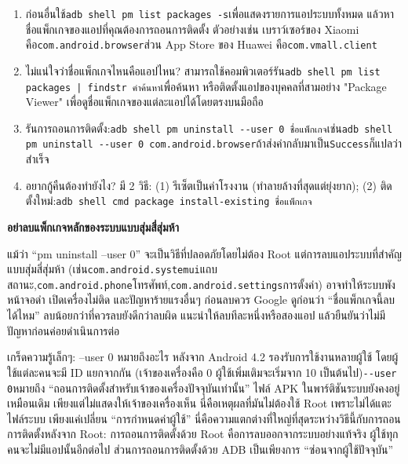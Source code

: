 \begin{enumerate}
  \item ก่อนอื่นใช้\texttt{adb shell pm list packages -\allowbreak s}เพื่อแสดงรายการแอประบบทั้งหมด แล้วหาชื่อแพ็กเกจของแอปที่คุณต้องการถอนการติดตั้ง ตัวอย่างเช่น เบราว์เซอร์ของ Xiaomi คือ\texttt{com.\allowbreak android.\allowbreak browser}ส่วน App Store ของ Huawei คือ\texttt{com.\allowbreak vmall.\allowbreak client}
  \item ไม่แน่ใจว่าชื่อแพ็กเกจไหนคือแอปไหน? สามารถใช้คอมพิวเตอร์รัน\texttt{adb shell pm list packages | findstr คำค้นหา}เพื่อค้นหา หรือติดตั้งแอปของบุคคลที่สามอย่าง "Package Viewer" เพื่อดูชื่อแพ็กเกจของแต่ละแอปได้โดยตรงบนมือถือ
  \item รันการถอนการติดตั้ง:\texttt{adb shell pm uninstall -\allowbreak -\allowbreak user 0 ชื่อแพ็กเกจ}เช่น\texttt{adb shell pm uninstall -\allowbreak -\allowbreak user 0 com.\allowbreak android.\allowbreak browser}ถ้าส่งค่ากลับมาเป็น\texttt{Success}ก็แปลว่าสำเร็จ
  \item อยากกู้คืนต้องทำยังไง? มี 2 วิธี: (1) รีเซ็ตเป็นค่าโรงงาน (ทำลายล้างที่สุดแต่ยุ่งยาก); (2) ติดตั้งใหม่:\texttt{adb shell cmd package install-\allowbreak existing ชื่อแพ็กเกจ}
\end{enumerate}

\textbf{อย่าลบแพ็กเกจหลักของระบบแบบสุ่มสี่สุ่มห้า}\par

แม้ว่า “pm uninstall --user 0” จะเป็นวิธีที่ปลอดภัยโดยไม่ต้อง Root แต่การลบแอประบบที่สำคัญแบบสุ่มสี่สุ่มห้า (เช่น\texttt{com.\allowbreak android.\allowbreak systemui}แถบสถานะ,\texttt{com.\allowbreak android.\allowbreak phone}โทรศัพท์,\texttt{com.\allowbreak android.\allowbreak settings}การตั้งค่า) อาจทำให้ระบบพัง หน้าจอดำ เปิดเครื่องไม่ติด และปัญหาร้ายแรงอื่นๆ ก่อนลบควร Google ดูก่อนว่า “ชื่อแพ็กเกจนี้ลบได้ไหม” ลบน้อยกว่าที่ควรลบยังดีกว่าลบผิด แนะนำให้ลบทีละหนึ่งหรือสองแอป แล้วยืนยันว่าไม่มีปัญหาก่อนค่อยดำเนินการต่อ

\begin{tcbinfo}{เกร็ดความรู้เล็กๆ: --user 0 หมายถึงอะไร}
หลังจาก Android 4.2 รองรับการใช้งานหลายผู้ใช้ โดยผู้ใช้แต่ละคนจะมี ID แยกจากกัน (เจ้าของเครื่องคือ 0 ผู้ใช้เพิ่มเติมจะเริ่มจาก 10 เป็นต้นไป)\texttt{-\allowbreak -\allowbreak user 0}หมายถึง “ถอนการติดตั้งสำหรับเจ้าของเครื่องปัจจุบันเท่านั้น” ไฟล์ APK ในพาร์ติชันระบบยังคงอยู่เหมือนเดิม เพียงแต่ไม่แสดงให้เจ้าของเครื่องเห็น นี่คือเหตุผลที่มันไม่ต้องใช้ Root เพราะไม่ได้แตะไฟล์ระบบ เพียงแค่เปลี่ยน “การกำหนดค่าผู้ใช้” นี่คือความแตกต่างที่ใหญ่ที่สุดระหว่างวิธีนี้กับการถอนการติดตั้งหลังจาก Root: การถอนการติดตั้งด้วย Root คือการลบออกจากระบบอย่างแท้จริง ผู้ใช้ทุกคนจะไม่มีแอปนั้นอีกต่อไป ส่วนการถอนการติดตั้งด้วย ADB เป็นเพียงการ “ซ่อนจากผู้ใช้ปัจจุบัน”

\end{tcbinfo}

